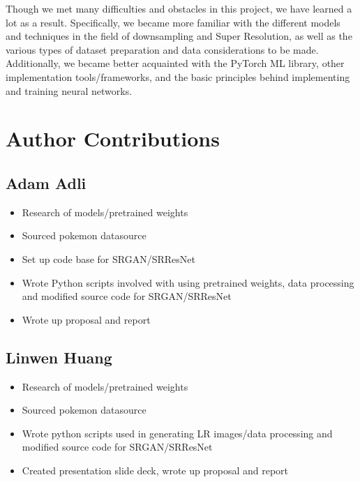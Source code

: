 \documentclass[11pt,titlepage]{article}
\begin{document}
Though we met many difficulties and obstacles in this project, we have learned a lot as a result. Specifically, we became more familiar with the different models and techniques in the field of downsampling and Super Resolution, as well as the various types of dataset preparation and data considerations to be made. Additionally, we became better acquainted with the PyTorch ML library, other implementation tools/frameworks, and the basic principles behind implementing and training neural networks.


\section*{Author Contributions}

\subsection*{Adam Adli}
\begin{itemize}
    \item Research of models/pretrained weights
    \item Sourced pokemon datasource
    \item Set up code base for SRGAN/SRResNet
    \item Wrote Python scripts involved with using pretrained weights, data processing and modified source code for SRGAN/SRResNet
    \item Wrote up proposal and report
\end{itemize}

\subsection*{Linwen Huang}
\begin{itemize}
    \item Research of models/pretrained weights
    \item Sourced pokemon datasource
    \item Wrote python scripts used in generating LR images/data processing and modified source code for SRGAN/SRResNet
    \item Created presentation slide deck, wrote up proposal and report
\end{itemize}
\end{document}
